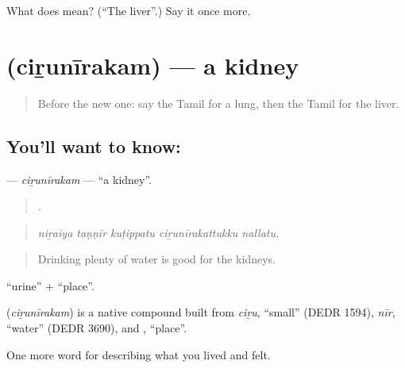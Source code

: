 \begin{tcolorbox}[breakable,colback=teal!4,colframe=teal!35!black,title={Before you move on}]
What does  mean? (\textquotedblleft{}The liver\textquotedblright{}.) Say it once more.
\end{tcolorbox}
\section[\texorpdfstring{\ta{சிறுநீரகம்} (ciṟunīrakam)}{சிறுநீரகம் (ciṟunīrakam)}]{ (ciṟunīrakam) — a kidney}

\label{lesson:TA-C478-cirunirakam}



\begin{quote}
Before the new one: say the Tamil for a lung, then the Tamil for the liver.
\end{quote}

\subsection*{You'll want to know: }
\textbf{} — \emph{ciṟunīrakam} — \textquotedblleft{}a kidney\textquotedblright{}.

\begin{quote}
    .
\end{quote}

\begin{quote}
\emph{niṟaiya taṇṇīr kuṭippatu ciṟunīrakattukku nallatu.}
\end{quote}

\begin{quote}
Drinking plenty of water is good for the kidneys.
\end{quote}

 \textquotedblleft{}urine\textquotedblright{} +  \textquotedblleft{}place\textquotedblright{}.

\begin{cousinweb}
\textbf{} (\emph{ciṟunīrakam}) is a native compound built from  \emph{ciṟu}, \textquotedblleft{}small\textquotedblright{} (DEDR 1594),  \emph{nīr}, \textquotedblleft{}water\textquotedblright{} (DEDR 3690), and , \textquotedblleft{}place\textquotedblright{}.
\end{cousinweb}

\begin{grammarlens}[title={What you've built}]
One more word for describing what you lived and felt.
\end{grammarlens}

